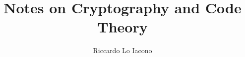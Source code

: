 \title{Notes on Cryptography and Code Theory}
\author{Riccardo Lo Iacono}
\institute{}

\usepackage{etextools}
\usepackage{mathtools,amsfonts,amssymb}
\usepackage{subfiles}
\sloppy

\newcommand\nset{\mathbb{N}}
\newcommand\zset{\mathbb{Z}}
\newcommand\K{\mathcal{K}}

\DeclareMathOperator\gf{GF}

\newcommand\gen[1]{\langle #1 \rangle}
